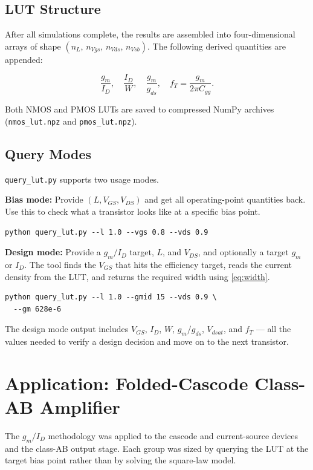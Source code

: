 \documentclass[conference]{IEEEtran}
\begin{document}
\subsection{LUT Structure}

After all simulations complete, the results are assembled into
four-dimensional arrays of shape $(n_L,\, n_{Vgs},\, n_{Vds},\, n_{Vsb})$.
The following derived quantities are appended:

\begin{equation}
  \frac{g_m}{I_D},\quad \frac{I_D}{W},\quad \frac{g_m}{g_{ds}},\quad
  f_T = \frac{g_m}{2\pi C_{gg}}.
\end{equation}

Both NMOS and PMOS LUTs are saved to compressed NumPy archives
(\texttt{nmos\_lut.npz} and \texttt{pmos\_lut.npz}).

\subsection{Query Modes}

\texttt{query\_lut.py} supports two usage modes.

\textbf{Bias mode:} Provide $(L, V_{GS}, V_{DS})$ and get all operating-point
quantities back.  Use this to check what a transistor looks like at a
specific bias point.

\begin{lstlisting}
python query_lut.py --l 1.0 --vgs 0.8 --vds 0.9
\end{lstlisting}

\textbf{Design mode:} Provide a $g_m/I_D$ target, $L$, and $V_{DS}$, and
optionally a target $g_m$ or $I_D$.  The tool finds the $V_{GS}$ that hits
the efficiency target, reads the current density from the LUT, and returns
the required width using \eqref{eq:width}.

\begin{lstlisting}
python query_lut.py --l 1.0 --gmid 15 --vds 0.9 \
  --gm 628e-6
\end{lstlisting}

The design mode output includes $V_{GS}$, $I_D$, $W$, $g_m/g_{ds}$,
$V_{dsat}$, and $f_T$ --- all the values needed to verify a design decision
and move on to the next transistor.

\section{Application: Folded-Cascode Class-AB Amplifier}
\label{sec:folded_cascode}
The $g_m/I_D$ methodology was applied to the cascode and current-source
devices and the class-AB output stage.  Each group was sized by querying the
LUT at the target bias point rather than by solving the square-law model.
\end{document}
